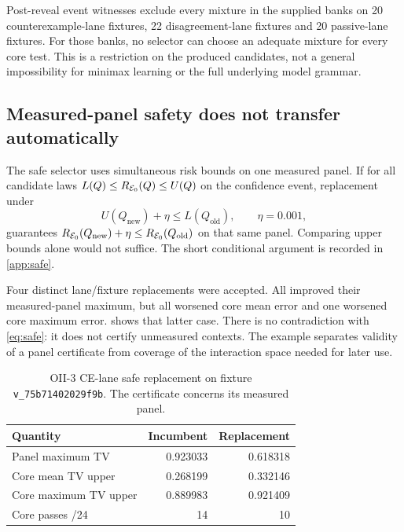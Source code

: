Post-reveal event witnesses exclude every mixture in the supplied banks on 20 counterexample-lane fixtures, 22 disagreement-lane fixtures and 20 passive-lane fixtures. For those banks, no selector can choose an adequate mixture for every core test. This is a restriction on the produced candidates, not a general impossibility for minimax learning or the full underlying model grammar.

\subsection{Measured-panel safety does not transfer automatically}\label{p3:c08}
The safe selector uses simultaneous risk bounds on one measured panel. If for all candidate laws $L(Q)\leq R_{\mathcal E_0}(Q)\leq U(Q)$ on the confidence event, replacement under
\begin{equation}
 U(Q_{\mathrm{new}})+\eta\leq L(Q_{\mathrm{old}}),\qquad \eta=0.001,
 \label{eq:safe}
\end{equation}
guarantees $R_{\mathcal E_0}(Q_{\mathrm{new}})+\eta\leq R_{\mathcal E_0}(Q_{\mathrm{old}})$ on that same panel. Comparing upper bounds alone would not suffice. The short conditional argument is recorded in \cref{app:safe}.

Four distinct lane/fixture replacements were accepted. All improved their measured-panel maximum, but all worsened core mean error and one worsened core maximum error.  shows that latter case. There is no contradiction with \cref{eq:safe}: it does not certify unmeasured contexts. The example separates validity of a panel certificate from coverage of the interaction space needed for later use.


\begin{table}[tbp]
\centering
\caption{OII-3 CE-lane safe replacement on fixture \texttt{v\_75b71402029f9b}. The certificate concerns its measured panel.}\label{tab:safe}
\small
\setlength{\tabcolsep}{5pt}
\begin{tabular}{lrr}
\toprule
Quantity & Incumbent & Replacement \\
\midrule
Panel maximum TV & 0.923033 & 0.618318 \\
Core mean TV upper & 0.268199 & 0.332146 \\
Core maximum TV upper & 0.889983 & 0.921409 \\
Core passes /24 & 14 & 10 \\
\bottomrule
\end{tabular}
\end{table}

